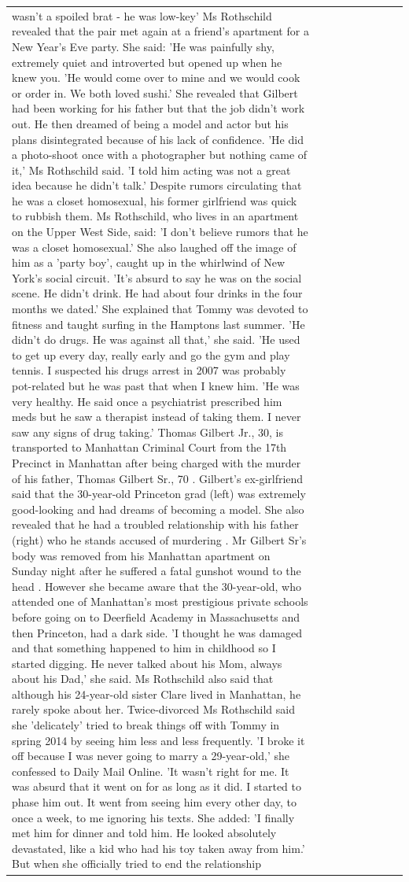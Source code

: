 \begin{table}[H]
\begin{tabular}{lllrlllll}
wasn't a spoiled brat - he was low-key' Ms Rothschild revealed that the pair met again at a friend’s apartment for a New Year’s Eve party. She said: 'He was painfully shy, extremely quiet and introverted but opened up when he knew you. 'He would come over to mine and we would cook or order in. We both loved sushi.' She revealed that Gilbert had been working for his father but that the job didn't work out. He then dreamed of being a model and actor but his plans disintegrated because of his lack of confidence. 'He did a photo-shoot once with a photographer but nothing came of it,' Ms Rothschild said. 'I told him acting was not a great idea because he didn’t talk.' Despite rumors circulating that he was a closet homosexual, his former girlfriend was quick to rubbish them. Ms Rothschild, who lives in an apartment on the Upper West Side, said: 'I don’t believe rumors that he was a closet homosexual.' She also laughed off the image of him as a 'party boy', caught up in the whirlwind of New York's social circuit. 'It’s absurd to say he was on the social scene. He didn’t drink. He had about four drinks in the four months we dated.' She explained that Tommy was devoted to fitness and taught surfing in the Hamptons last summer. 'He didn’t do drugs. He was against all that,' she said. 'He used to get up every day, really early and go the gym and play tennis. I suspected his drugs arrest in 2007 was probably pot-related but he was past that when I knew him. 'He was very healthy. He said once a psychiatrist prescribed him meds but he saw a therapist instead of taking them. I never saw any signs of drug taking.' Thomas Gilbert Jr., 30, is transported to Manhattan Criminal Court from the 17th Precinct in Manhattan after being charged with the murder of his father, Thomas Gilbert Sr., 70 . Gilbert's ex-girlfriend said that the 30-year-old Princeton grad (left) was extremely good-looking and had dreams of becoming a model. She also revealed that he had a troubled relationship with his father (right) who he stands accused of murdering . Mr Gilbert Sr's body was removed from his Manhattan apartment on Sunday night after he suffered a fatal gunshot wound to the head . However she became aware that the 30-year-old, who attended one of Manhattan's most prestigious private schools before going on to Deerfield Academy in Massachusetts and then Princeton, had a dark side. 'I thought he was damaged and that something happened to him in childhood so I started digging. He never talked about his Mom, always about his Dad,' she said. Ms Rothschild also said that although his 24-year-old sister Clare lived in Manhattan, he rarely spoke about her. Twice-divorced Ms Rothschild said she 'delicately' tried to break things off with Tommy in spring 2014 by seeing him less and less frequently. 'I broke it off because I was never going to marry a 29-year-old,' she confessed to Daily Mail Online. 'It wasn’t right for me. It was absurd that it went on for as long as it did. I started to phase him out. It went from seeing him every other day, to once a week, to me ignoring his texts. She added: 'I finally met him for dinner and told him. He looked absolutely devastated, like a kid who had his toy taken away from him.' But when she officially tried to end the relationship 
\end{tabular}
\end{table}
